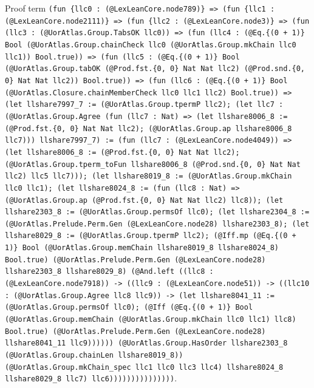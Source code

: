 \documentclass[11pt]{article}
\begin{document}
\noindent Proof term \texttt{(fun \{llc0 : (@LexLeanCore.node789)\} => (fun \{llc1 : (@LexLeanCore.node2111)\} => (fun \{llc2 : (@LexLeanCore.node3)\} => (fun (llc3 : (@UorAtlas.Group.TabsOK llc0)) => (fun (llc4 : (@Eq.\{(0 + 1)\} Bool (@UorAtlas.Group.chainCheck llc0 (@UorAtlas.Group.mkChain llc0 llc1)) Bool.true)) => (fun (llc5 : (@Eq.\{(0 + 1)\} Bool (@UorAtlas.Group.tabOK (@Prod.fst.\{0, 0\} Nat Nat llc2) (@Prod.snd.\{0, 0\} Nat Nat llc2)) Bool.true)) => (fun (llc6 : (@Eq.\{(0 + 1)\} Bool (@UorAtlas.Closure.chainMemberCheck llc0 llc1 llc2) Bool.true)) => (let llshare7997\_7 := (@UorAtlas.Group.tpermP llc2); (let llc7 : (@UorAtlas.Group.Agree (fun (llc7 : Nat) => (let llshare8006\_8 := (@Prod.fst.\{0, 0\} Nat Nat llc2); (@UorAtlas.Group.ap llshare8006\_8 llc7))) llshare7997\_7) := (fun (llc7 : (@LexLeanCore.node4049)) => (let llshare8006\_8 := (@Prod.fst.\{0, 0\} Nat Nat llc2); (@UorAtlas.Group.tperm\_toFun llshare8006\_8 (@Prod.snd.\{0, 0\} Nat Nat llc2) llc5 llc7))); (let llshare8019\_8 := (@UorAtlas.Group.mkChain llc0 llc1); (let llshare8024\_8 := (fun (llc8 : Nat) => (@UorAtlas.Group.ap (@Prod.fst.\{0, 0\} Nat Nat llc2) llc8)); (let llshare2303\_8 := (@UorAtlas.Group.permsOf llc0); (let llshare2304\_8 := (@UorAtlas.Prelude.Perm.Gen (@LexLeanCore.node28) llshare2303\_8); (let llshare8029\_8 := (@UorAtlas.Group.tpermP llc2); (@Iff.mp (@Eq.\{(0 + 1)\} Bool (@UorAtlas.Group.memChain llshare8019\_8 llshare8024\_8) Bool.true) (@UorAtlas.Prelude.Perm.Gen (@LexLeanCore.node28) llshare2303\_8 llshare8029\_8) (@And.left ((llc8 : (@LexLeanCore.node7918)) -> ((llc9 : (@LexLeanCore.node51)) -> ((llc10 : (@UorAtlas.Group.Agree llc8 llc9)) -> (let llshare8041\_11 := (@UorAtlas.Group.permsOf llc0); (@Iff (@Eq.\{(0 + 1)\} Bool (@UorAtlas.Group.memChain (@UorAtlas.Group.mkChain llc0 llc1) llc8) Bool.true) (@UorAtlas.Prelude.Perm.Gen (@LexLeanCore.node28) llshare8041\_11 llc9)))))) (@UorAtlas.Group.HasOrder llshare2303\_8 (@UorAtlas.Group.chainLen llshare8019\_8)) (@UorAtlas.Group.mkChain\_spec llc1 llc0 llc3 llc4) llshare8024\_8 llshare8029\_8 llc7) llc6)))))))))))))))}.\par
\end{document}
